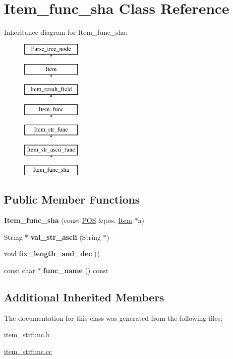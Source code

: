 \hypertarget{classItem__func__sha}{}\section{Item\+\_\+func\+\_\+sha Class Reference}
\label{classItem__func__sha}
Inheritance diagram for Item\+\_\+func\+\_\+sha\+:\begin{figure}[H]
\begin{center}
\leavevmode
\includegraphics[height=7.000000cm]{classItem__func__sha}
\end{center}
\end{figure}
\subsection*{Public Member Functions}
\begin{DoxyCompactItemize}
\item 
\mbox{\label{classItem__func__sha_afcad839ecc9555874382e99ef6b59c38}} 
{\bfseries Item\+\_\+func\+\_\+sha} (const \mbox{\hyperlink{structYYLTYPE}{P\+OS}} \&pos, \mbox{\hyperlink{classItem}{Item}} $\ast$a)
\item 
\mbox{\label{classItem__func__sha_a1aca900400731d1b6e6086c519331cdc}} 
String $\ast$ {\bfseries val\+\_\+str\+\_\+ascii} (String $\ast$)
\item 
\mbox{\label{classItem__func__sha_acc0c1b28e026a0ca4c321d153fe455fe}} 
void {\bfseries fix\+\_\+length\+\_\+and\+\_\+dec} ()
\item 
\mbox{\label{classItem__func__sha_aa15c7f8287452e6ca0b3a7e6cf7f7abe}} 
const char $\ast$ {\bfseries func\+\_\+name} () const
\end{DoxyCompactItemize}
\subsection*{Additional Inherited Members}


The documentation for this class was generated from the following files\+:\begin{DoxyCompactItemize}
\item 
item\+\_\+strfunc.\+h\item 
\mbox{\hyperlink{item__strfunc_8cc}{item\+\_\+strfunc.\+cc}}\end{DoxyCompactItemize}
